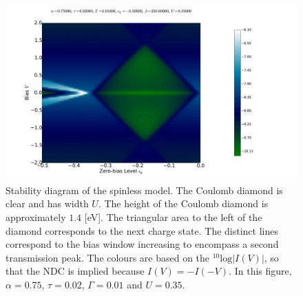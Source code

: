 \begin{figure}[htb]
    \centering
    \includegraphics[height=.38\textheight]{pdf/coulombd/current_map_diamond_alpha_075.pdf}
    \caption{Stability diagram of the spinless model. The Coulomb diamond is clear and has width $U$. The height of the Coulomb diamond is approximately $1.4$ [eV]. The triangular area to the left of the diamond corresponds to the next charge state. The distinct lines correspond to the bias window increasing to encompass a second transmission peak. The colours are based on the $^{10}\text{log}\left|I(V)\right|$, so that the NDC is implied because $I(V) = -I(-V)$. In this figure, $\alpha=0.75$, $\tau=0.02$, $\Gamma = 0.01$ and $U=0.35$.}
    \label{fig:diamond75}
\end{figure}


